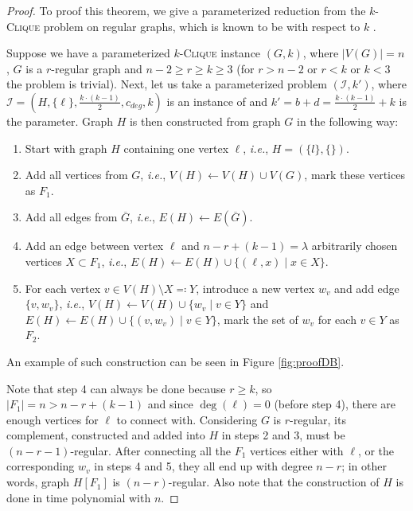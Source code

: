 \begin{proof}\label{proofDB}
    To proof this theorem, we give a parameterized reduction from the $k$-\textsc{Clique} problem on regular graphs,
    which is known to be \Wh with respect to $k$ \cite{Mathieson2008}.
    
    Suppose we have a parameterized $k$-\textsc{Clique} instance $(G, k)$, where
    $|V(G)|=n$, $G$ is a $r$-regular graph and $n-2 \geq r \geq k \geq 3$ (for $r > n-2$ or $r < k$ or $k < 3$ the problem is trivial).
    Next, let us take a parameterized problem $(\mathcal{I}, k')$, where
    $\mathcal{I} = (H, \{\ell\}, \frac{k\cdot(k-1)}{2}, c_{deg}, k)$ is an instance of \HLdeg and
    $k' = b + d = \frac{k\cdot(k-1)}{2} + k$ is the parameter.
    Graph $H$ is then constructed from graph $G$ in the following way:

    \begin{enumerate}
        \item Start with graph $H$ containing one vertex $\ell$, \emph{i.e.}, $H = (\{l\}, \{\})$.
        \item Add all vertices from $G$, \emph{i.e.}, $V(H) \leftarrow V(H) \cup V(G)$, mark these vertices as $F_1$.
        \item Add all edges from $\overline{G}$, \emph{i.e.}, $E(H) \leftarrow E(\overline{G})$.
        \item Add an edge between vertex $\ell$ and $n - r + (k - 1) = \lambda$ arbitrarily chosen vertices $X \subset F_1$,
        \emph{i.e.}, $E(H) \leftarrow E(H) \cup \{ (\ell, x) \mid x \in X \}$.
        \item For each vertex $v \in V(H) \setminus X \eqqcolon Y$, introduce a new vertex $w_v$ and add edge $\{v, w_v\}$, \emph{i.e.},
              $V(H) \leftarrow V(H) \cup \{ w_v \mid v \in Y \}$ and $E(H) \leftarrow E(H) \cup \{ (v, w_v) \mid v \in Y \}$,
              mark the set of $w_v$ for each $v \in Y$ as $F_2$.
    \end{enumerate}
    An example of such construction can be seen in Figure \ref{fig:proofDB}.

    Note that step 4 can always be done because $r \ge k$, so $|F_1| = n > n - r + (k - 1)$
    and since $\deg(\ell) = 0$ (before step 4), there are enough vertices for $\ell$ to connect with.
    Considering $G$ is $r$-regular, its complement, constructed and added into $H$ in steps 2 and 3, must be $(n-r-1)$-regular.
    After connecting all the $F_1$ vertices either with $\ell$, or the corresponding $w_v$ in steps 4 and 5,
    they all end up with degree $n-r$; in other words, graph $H[F_1]$ is $(n-r)$-regular.
    Also note that the construction of $H$ is done in time polynomial with $n$.


\end{proof}
